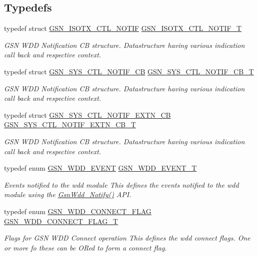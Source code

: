 \subsection*{Typedefs}
\begin{DoxyCompactItemize}
\item 
typedef struct \hyperlink{a00101}{GSN\_\-ISOTX\_\-CTL\_\-NOTIF} \hyperlink{a00677_ga26be8d25f388b7b118a0cd750dbdaeb1}{GSN\_\-ISOTX\_\-CTL\_\-NOTIF\_\-T}
\begin{DoxyCompactList}\small\item\em GSN WDD Notification CB structure. Datastructure having various indication call back and respective context. \end{DoxyCompactList}\item 
typedef struct \hyperlink{a00253}{GSN\_\-SYS\_\-CTL\_\-NOTIF\_\-CB} \hyperlink{a00677_ga1afa369ae85e712e56f39e318e3dfb26}{GSN\_\-SYS\_\-CTL\_\-NOTIF\_\-CB\_\-T}
\begin{DoxyCompactList}\small\item\em GSN WDD Notification CB structure. Datastructure having various indication call back and respective context. \end{DoxyCompactList}\item 
typedef struct \hyperlink{a00254}{GSN\_\-SYS\_\-CTL\_\-NOTIF\_\-EXTN\_\-CB} \hyperlink{a00677_ga3fdb6c5df43ccafac3c0d58243f572b0}{GSN\_\-SYS\_\-CTL\_\-NOTIF\_\-EXTN\_\-CB\_\-T}
\begin{DoxyCompactList}\small\item\em GSN WDD Notification CB structure. Datastructure having various indication call back and respective context. \end{DoxyCompactList}\item 
typedef enum \hyperlink{a00677_ga1ff070ddd12f2dfd9bc0e26f84b4888c}{GSN\_\-WDD\_\-EVENT} \hyperlink{a00677_ga82734573aab1decd3ffd115af490f892}{GSN\_\-WDD\_\-EVENT\_\-T}
\begin{DoxyCompactList}\small\item\em Events notified to the wdd module This defines the events notified to the wdd module using the \hyperlink{a00677_ga3b57a234af35c0dc77fa3760a2f3f07f}{GsnWdd\_\-Notify()} API. \end{DoxyCompactList}\item 
typedef enum \hyperlink{a00677_ga2846a7c5251eb6332e71299cef92d003}{GSN\_\-WDD\_\-CONNECT\_\-FLAG} \hyperlink{a00677_ga3a599f8d47bbbf9108f9156cddf9bd4b}{GSN\_\-WDD\_\-CONNECT\_\-FLAG\_\-T}
\begin{DoxyCompactList}\small\item\em Flags for GSN WDD Connect operation This defines the wdd connect flags. One or more fo these can be ORed to form a connect flag. \end{DoxyCompactList}\item 

\end{DoxyCompactItemize}
